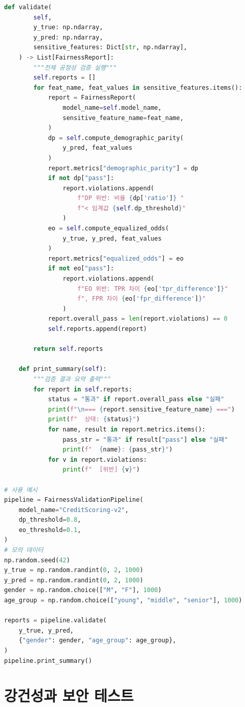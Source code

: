 \begin{lstlisting}[language=Python, caption={Fairlearn 기반 공정성 자동 검증 파이프라인}, label={lst:fairness_pipeline}]
    def validate(
        self,
        y_true: np.ndarray,
        y_pred: np.ndarray,
        sensitive_features: Dict[str, np.ndarray],
    ) -> List[FairnessReport]:
        """전체 공정성 검증 실행"""
        self.reports = []
        for feat_name, feat_values in sensitive_features.items():
            report = FairnessReport(
                model_name=self.model_name,
                sensitive_feature_name=feat_name,
            )
            dp = self.compute_demographic_parity(
                y_pred, feat_values
            )
            report.metrics["demographic_parity"] = dp
            if not dp["pass"]:
                report.violations.append(
                    f"DP 위반: 비율 {dp['ratio']} "
                    f"< 임계값 {self.dp_threshold}"
                )
            eo = self.compute_equalized_odds(
                y_true, y_pred, feat_values
            )
            report.metrics["equalized_odds"] = eo
            if not eo["pass"]:
                report.violations.append(
                    f"EO 위반: TPR 차이 {eo['tpr_difference']}"
                    f", FPR 차이 {eo['fpr_difference']}"
                )
            report.overall_pass = len(report.violations) == 0
            self.reports.append(report)

        return self.reports

    def print_summary(self):
        """검증 결과 요약 출력"""
        for report in self.reports:
            status = "통과" if report.overall_pass else "실패"
            print(f"\n=== {report.sensitive_feature_name} ===")
            print(f"  상태: {status}")
            for name, result in report.metrics.items():
                pass_str = "통과" if result["pass"] else "실패"
                print(f"  {name}: {pass_str}")
            for v in report.violations:
                print(f"  [위반] {v}")

# 사용 예시
pipeline = FairnessValidationPipeline(
    model_name="CreditScoring-v2",
    dp_threshold=0.8,
    eo_threshold=0.1,
)
# 모의 데이터
np.random.seed(42)
y_true = np.random.randint(0, 2, 1000)
y_pred = np.random.randint(0, 2, 1000)
gender = np.random.choice(["M", "F"], 1000)
age_group = np.random.choice(["young", "middle", "senior"], 1000)

reports = pipeline.validate(
    y_true, y_pred,
    {"gender": gender, "age_group": age_group},
)
pipeline.print_summary()
\end{lstlisting}

\section{강건성과 보안 테스트}
\label{sec:10.4}

